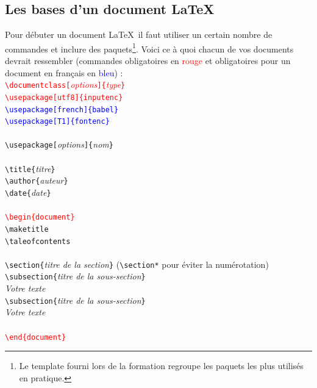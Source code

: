 \documentclass[11pt]{article}				%
\newcommand{\tb}{\textbackslash}
\newcommand{\cmdo}[3][]{\texttt{\textbackslash #2}\texttt{[#1}\texttt{]\{#3\}}}
\newcommand{\cmdoi}[3][]{\texttt{\textbackslash #2}\texttt{[}\textit{#1}\texttt{]\{}\textit{#3}\texttt{\}}}
\newcommand{\cmd}[2]{\texttt{\textbackslash #1}\texttt{\{#2\}}}
\newcommand{\cmdi}[2]{\texttt{\textbackslash #1}\texttt{\{}\textit{#2}\texttt{\}}}
\begin{document}
\clearpage

\subsection{Les bases d'un document \LaTeX}


\noindent Pour débuter un document \LaTeX \ il faut utiliser un certain nombre de commandes et inclure des paquets\footnote{Le template fourni lors de la formation regroupe les paquets les plus utilisés en pratique.}. Voici ce à quoi chacun de vos documents devrait ressembler (commandes obligatoires en \textcolor{red}{rouge} et obligatoires pour un document en français en \textcolor{blue}{bleu}) : \\

\noindent
\textcolor{red}{\cmdoi[options]{documentclass}{type}} \\
\textcolor{red}{\cmdo[utf8]{usepackage}{inputenc}} \\
\textcolor{blue}{\cmdo[french]{usepackage}{babel}} \\
\textcolor{blue}{\cmdo[T1]{usepackage}{fontenc}} \\
~\\
\cmdoi[options]{usepackage}{nom} \\
~\\ 
\cmdi{title}{titre} \\
\cmdi{author}{auteur} \\
\cmdi{date}{date} \\
~\\ 
\textcolor{red}{\cmd{begin}{document}}\\
\texttt{\tb maketitle} \\
\texttt{\tb taleofcontents} \\
~\\
\cmdi{section}{titre de la section} \quad (\texttt{\tb section*} pour éviter la numérotation)	 \\
\cmdi{subsection}{titre de la sous-section} \\
\textit{Votre texte}\\

\cmdi{subsection}{titre de la sous-section} \\
\textit{Votre texte} \\
~\\
\textcolor{red}{\texttt{\tb end\{document\}}} \\
\end{document}
